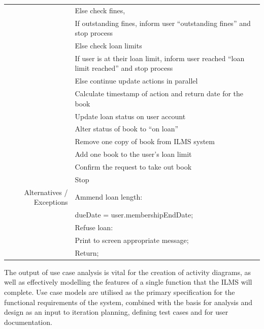 \begin{longtabu}{|r|X|}
    & Else check fines, \\
    & If outstanding fines, inform user ``outstanding fines'' and stop process \\
    & Else check loan limits \\
    & If user is at their loan limit, inform user reached ``loan limit reached'' and stop process \\
    & Else continue update actions in parallel \\
    & Calculate timestamp of action and return date for the book \\
    & Update loan status on user account \\
    & Alter status of book to “on loan” \\
    & Remove one copy of book from ILMS system \\
    & Add one book to the user’s loan limit \\
    & Confirm the request to take out book \\
    & Stop \\\hline
    Alternatives / Exceptions & Ammend loan length: \\
    & dueDate = user.membershipEndDate; \\
    & Refuse loan: \\
    & Print to screen appropriate message; \\
    & Return; \\\hline
\end{longtabu}
\endgroup

The output of use case analysis is vital for the creation of activity diagrams, as well as effectively modelling the features of a single function that the ILMS will complete. Use case models are utilised as the primary specification for the functional requirements of the system, combined with the basis for analysis and design as an input to iteration planning, defining test cases and for user documentation\cite{usecaseanalliu}.